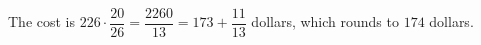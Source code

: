 The cost is $226 \cdot \dfrac{20}{26} = \dfrac{2260}{13} = 173 + \dfrac{11}{13}$ dollars, which rounds to $\boxed{174}$ dollars.
